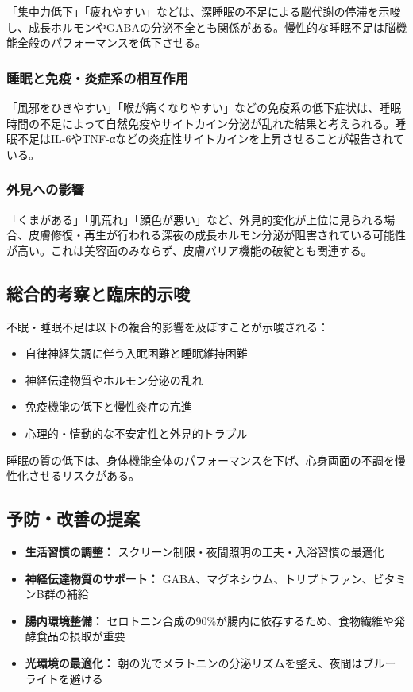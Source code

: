 \documentclass[a4paper,12pt]{article}
\begin{document}
「集中力低下」「疲れやすい」などは、深睡眠の不足による脳代謝の停滞を示唆し、成長ホルモンやGABAの分泌不全とも関係がある。慢性的な睡眠不足は脳機能全般のパフォーマンスを低下させる。

\subsubsection*{睡眠と免疫・炎症系の相互作用}

「風邪をひきやすい」「喉が痛くなりやすい」などの免疫系の低下症状は、睡眠時間の不足によって自然免疫やサイトカイン分泌が乱れた結果と考えられる。睡眠不足はIL-6やTNF-αなどの炎症性サイトカインを上昇させることが報告されている。

\subsubsection*{外見への影響}

「くまがある」「肌荒れ」「顔色が悪い」など、外見的変化が上位に見られる場合、皮膚修復・再生が行われる深夜の成長ホルモン分泌が阻害されている可能性が高い。これは美容面のみならず、皮膚バリア機能の破綻とも関連する。

\subsection*{総合的考察と臨床的示唆}

不眠・睡眠不足は以下の複合的影響を及ぼすことが示唆される：

\begin{itemize}
  \item 自律神経失調に伴う入眠困難と睡眠維持困難
  \item 神経伝達物質やホルモン分泌の乱れ
  \item 免疫機能の低下と慢性炎症の亢進
  \item 心理的・情動的な不安定性と外見的トラブル
\end{itemize}

睡眠の質の低下は、身体機能全体のパフォーマンスを下げ、心身両面の不調を慢性化させるリスクがある。

\subsection*{予防・改善の提案}

\begin{itemize}
  \item \textbf{生活習慣の調整：} スクリーン制限・夜間照明の工夫・入浴習慣の最適化
  \item \textbf{神経伝達物質のサポート：} GABA、マグネシウム、トリプトファン、ビタミンB群の補給
  \item \textbf{腸内環境整備：} セロトニン合成の90\%が腸内に依存するため、食物繊維や発酵食品の摂取が重要
  \item \textbf{光環境の最適化：} 朝の光でメラトニンの分泌リズムを整え、夜間はブルーライトを避ける
\end{itemize}
\end{document}
